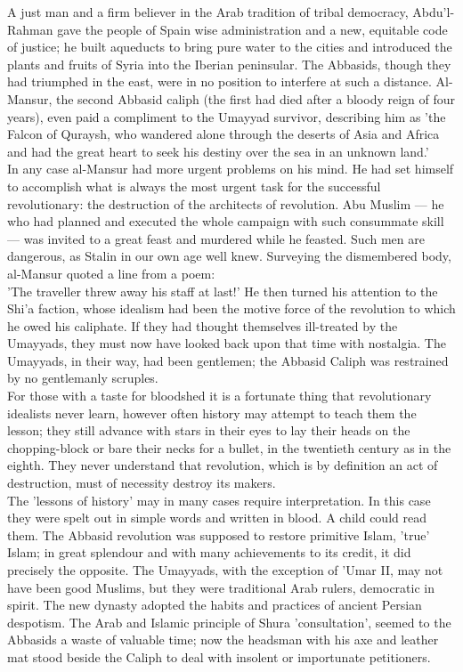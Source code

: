 \documentclass[10pt, twoside]{book}
\begin{document}
A just man and a firm believer in the Arab tradition of tribal democracy, Abdu'l\hyp{}Rahman gave the 
people of Spain wise administration and a new, equitable code of justice; he built aqueducts to bring 
pure water to the cities and introduced the plants and fruits of Syria into the Iberian peninsular. 
The Abbasids, though they had triumphed in the east, were in no position to interfere at such a 
distance. Al\hyp{}Mansur, the second Abbasid caliph (the first had died after a bloody reign of four 
years), even paid a compliment to the Umayyad survivor, describing him as 'the Falcon of Quraysh, who 
wandered alone through the deserts of Asia and Africa and had the great heart to seek his destiny 
over the sea in an unknown land.' \\

In any case al\hyp{}Mansur had more urgent problems on his mind. He had set himself to accomplish what is 
always the most urgent task for the successful revolutionary: the destruction of the architects of 
revolution. Abu Muslim --- he who had planned and executed the whole campaign with such consummate 
skill --- was invited to a great feast and murdered while he feasted. Such men are dangerous, as Stalin 
in our own age well knew. Surveying the dismembered body, al-Mansur quoted a line from a poem: \\

'The traveller threw away his staff at last!' He then turned his attention to the Shi'a faction, 
whose idealism had been the motive force of the revolution to which he owed his caliphate. If they 
had thought themselves ill\hyp{}treated by the Umayyads, they must now have looked back upon that time 
with nostalgia. The Umayyads, in their way, had been gentlemen; the Abbasid Caliph was restrained by 
no gentlemanly scruples. \\

For those with a taste for bloodshed it is a fortunate thing that revolutionary idealists never 
learn, however often history may attempt to teach them the lesson; they still advance with stars in 
their eyes to lay their heads on the chopping\hyp{}block or bare their necks for a bullet, in the 
twentieth century as in the eighth. They never understand that revolution, which is by definition an 
act of destruction, must of necessity destroy its makers. \\

The 'lessons of history' may in many cases require interpretation. In this case they were spelt out 
in simple words and written in blood. A child could read them. The Abbasid revolution was supposed to 
restore primitive Islam, 'true' Islam; in great splendour and with many achievements to its credit, 
it did precisely the opposite. The Umayyads, with the exception of 'Umar II, may not have been good 
Muslims, but they were traditional Arab rulers, democratic in spirit. The new dynasty adopted the 
habits and practices of ancient Persian despotism. The Arab and Islamic principle of Shura 
'consultation', seemed to the Abbasids a waste of valuable time; now the headsman with his axe and 
leather mat stood beside the Caliph to deal with insolent or importunate petitioners. \\
\end{document}
